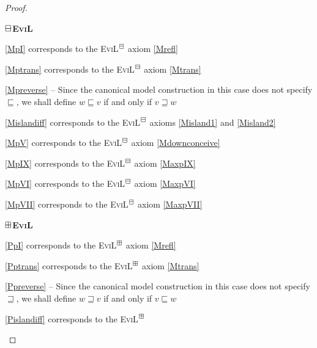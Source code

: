 \begin{proof}
\begin{minipage}[b]{0.5\linewidth}
\begin{center}
\textbf{$\boxminus$\textsc{EviL}}
\end{center}
  \begin{empt}
    \item \ref{MpI} corresponds to the \textsc{EviL}$^\boxminus$ axiom \eqref{Mrefl}
    \item \ref{Mptrans} corresponds to the \textsc{EviL}$^\boxminus$ axiom \eqref{Mtrans}
    \item \ref{Mpreverse} -- Since the canonical model construction in
      this case does not specify $\sqsubseteq$, we shall define 
     $w \sqsubseteq  v$ if and only if $v \sqsupseteq w$
   \item \ref{Mislandiff} corresponds to the \textsc{EviL}$^\boxminus$
     axioms \eqref{Misland1} and \eqref{Misland2}
    \item \ref{MpV} corresponds to the \textsc{EviL}$^\boxminus$
     axiom \eqref{Mdownconceive}
    \item \ref{MpIX} corresponds to the \textsc{EviL}$^\boxminus$
     axiom \eqref{MaxpIX}
     \item \ref{MpVI} corresponds to the \textsc{EviL}$^\boxminus$
     axiom \eqref{MaxpVI}
     \item \ref{MpVII} corresponds to the \textsc{EviL}$^\boxminus$
     axiom \eqref{MaxpVII}
  \end{empt}
\end{minipage}
\hspace{0.5cm}
\begin{minipage}[b]{0.5\linewidth}
\begin{center}
\textbf{$\boxplus$\textsc{EviL}}
\end{center}
  \begin{empt}
    \item \ref{PpI} corresponds to the \textsc{EviL}$^\boxplus$ axiom \eqref{Mrefl}
    \item \ref{Pptrans} corresponds to the \textsc{EviL}$^\boxplus$ axiom \eqref{Mtrans}
    \item \ref{Ppreverse} -- Since the canonical model construction in
      this case does not specify $\sqsupseteq$, we shall define 
     $w \sqsupseteq  v$ if and only if $v \sqsubseteq w$
   \item \ref{Pislandiff} corresponds to the \textsc{EviL}$^\boxplus$

\end{empt}
\end{minipage}
\end{proof}
